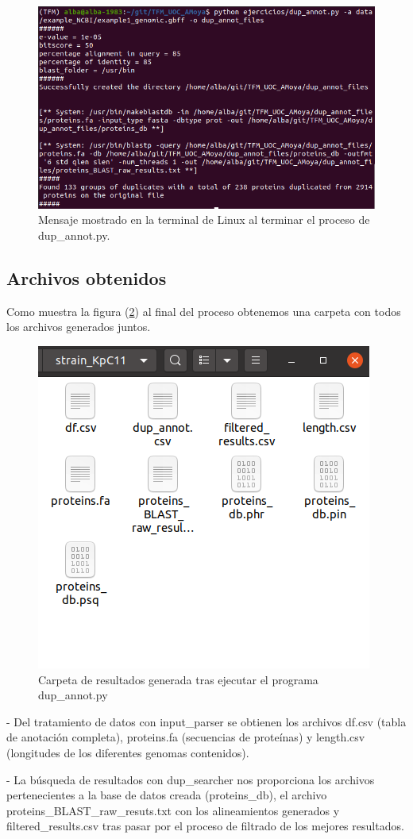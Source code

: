 \begin{figure}[h]
	\centering
	\captionsetup{width=0.7\linewidth} 
	\includegraphics[width=0.7\linewidth]{figs/salida_dup_annot.png}
	\caption[Mensaje terminal de dup\_annot.py]{Mensaje mostrado en la terminal de Linux al terminar el proceso de dup\_annot.py.}
	\label{fig:salida_dup_annot}
\end{figure}

\subsection{Archivos obtenidos} 

Como muestra la figura (\ref{fig:salida_dup_annot}) al final del proceso obtenemos una carpeta con todos los archivos generados juntos.

\begin{figure}[h]
	\centering
	\captionsetup{width=0.4\linewidth} 
	\includegraphics[width=0.4\linewidth]{figs/input_parser_files.png}
	\caption[Carpeta de resultados]{Carpeta de resultados generada tras ejecutar el programa dup\_annot.py}
	\label{fig:salida_dup_annot}
\end{figure}

- Del tratamiento de datos con input\_parser se obtienen los archivos df.csv (tabla de anotación completa), proteins.fa (secuencias de proteínas) y length.csv (longitudes de los diferentes genomas contenidos).

- La búsqueda de resultados con dup\_searcher nos proporciona los archivos pertenecientes a la base de datos creada (proteins\_db), el archivo proteins\_BLAST\_raw\_resuts.txt con los alineamientos generados y filtered\_results.csv tras pasar por el proceso de filtrado de los mejores resultados.

